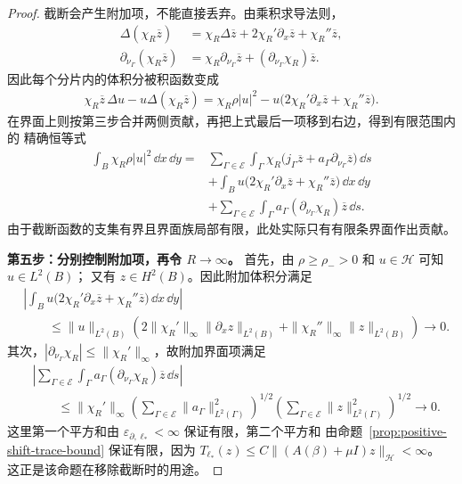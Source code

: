 \begin{proof}
  截断会产生附加项，不能直接丢弃。由乘积求导法则，
  \begin{align*}
    \Delta(\chi_R\overline z)
      &=\chi_R\Delta\overline z
        +2\chi_R'\partial_x\overline z+\chi_R''\overline z,\\
    \partial_{\nu_\Gamma}(\chi_R\overline z)
      &=\chi_R\partial_{\nu_\Gamma}\overline z
        +(\partial_{\nu_\Gamma}\chi_R)\overline z.
  \end{align*}
  因此每个分片内的体积分被积函数变成
  \begin{align*}
    \chi_R\overline z\,\Delta u-u\Delta(\chi_R\overline z)
    =\chi_R\rho|u|^2
      -u\bigl(2\chi_R'\partial_x\overline z+\chi_R''\overline z\bigr).
  \end{align*}
  在界面上则按第三步合并两侧贡献，再把上式最后一项移到右边，得到有限范围内的
  精确恒等式
  \begin{align*}
    \int_B\chi_R\rho|u|^2\,\dd x\,\dd y
    ={}&\sum_{\Gamma\in\mathscr E}\int_\Gamma
      \chi_R\bigl(j_\Gamma\overline z
        +a_\Gamma\partial_{\nu_\Gamma}\overline z\bigr)\,\dd s\\
    &+\int_Bu\bigl(2\chi_R'\partial_x\overline z
        +\chi_R''\overline z\bigr)\,\dd x\,\dd y\\
    &+\sum_{\Gamma\in\mathscr E}\int_\Gamma
      a_\Gamma(\partial_{\nu_\Gamma}\chi_R)\overline z\,\dd s.
  \end{align*}
  由于截断函数的支集有界且界面族局部有限，此处实际只有有限条界面作出贡献。

  \smallskip\noindent
  \textbf{第五步：分别控制附加项，再令 $R\to\infty$。}
  首先，由 $\rho\geq\rho_->0$ 和 $u\in\mathcal H$ 可知 $u\in L^2(B)$；
  又有 $z\in H^2(B)$。因此附加体积分满足
  \begin{align*}
    &\left|\int_Bu\bigl(2\chi_R'\partial_x\overline z
      +\chi_R''\overline z\bigr)\,\dd x\,\dd y\right|\\
    &\qquad\leq\|u\|_{L^2(B)}
      \left(2\|\chi_R'\|_\infty\|\partial_xz\|_{L^2(B)}
        +\|\chi_R''\|_\infty\|z\|_{L^2(B)}\right)
      \longrightarrow0.
  \end{align*}
  其次，$|\partial_{\nu_\Gamma}\chi_R|\leq\|\chi_R'\|_\infty$，故附加界面项满足
  \begin{align*}
    &\left|\sum_{\Gamma\in\mathscr E}\int_\Gamma
      a_\Gamma(\partial_{\nu_\Gamma}\chi_R)\overline z\,\dd s\right|\\
    &\qquad\leq\|\chi_R'\|_\infty
      \left(\sum_{\Gamma\in\mathscr E}\|a_\Gamma\|_{L^2(\Gamma)}^2\right)^{1/2}
      \left(\sum_{\Gamma\in\mathscr E}\|z\|_{L^2(\Gamma)}^2\right)^{1/2}
      \longrightarrow0.
  \end{align*}
  这里第一个平方和由 $\varepsilon_{\partial,\ell_*}<\infty$ 保证有限，第二个平方和
  由命题~\ref{prop:positive-shift-trace-bound} 保证有限，因为
  $T_{\ell_*}(z)\leq C\|(A(\beta)+\mu I)z\|_{\mathcal H}<\infty$。
  这正是该命题在移除截断时的用途。


\end{proof}
